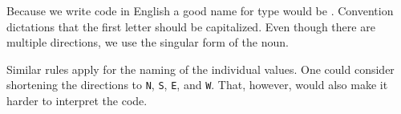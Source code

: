 Because we write code in English a good name for type would be . Convention dictations that the first letter should be capitalized. Even though there are multiple directions, we use the singular form of the noun.

Similar rules apply for the naming of the individual values. One could consider shortening the directions to \texttt{N}, \texttt{S}, \texttt{E}, and \texttt{W}. That, however, would also make it harder to interpret the code.

\inputminted{csharp}{\context/answer/Direction.cs}
